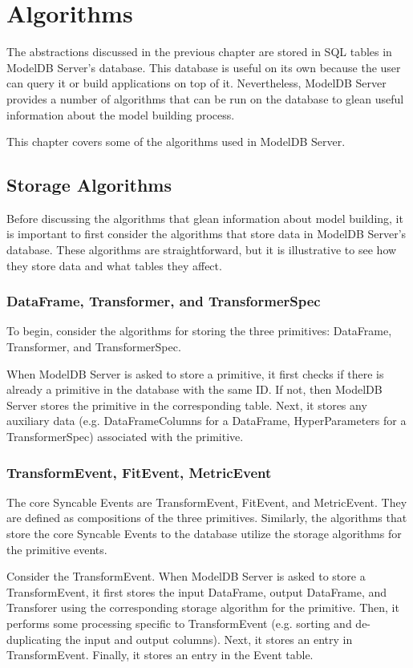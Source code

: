\chapter{Algorithms}
The abstractions discussed in the previous chapter are stored in SQL tables in
ModelDB Server's database. This database is useful on its own because the user can
query it or build applications on top of it. Nevertheless, ModelDB Server provides
a number of algorithms that can be run on the database to glean useful information
about the model building process.

This chapter covers some of the algorithms used in ModelDB Server.

\section{Storage Algorithms}
Before discussing the algorithms that glean information about model building, it
is important to first consider the algorithms that store data in ModelDB Server's 
database. These algorithms are straightforward, but it is illustrative to see
how they store data and what tables they affect.

\subsection{DataFrame, Transformer, and TransformerSpec}
To begin, consider the algorithms for storing the three primitives: DataFrame, 
Transformer, and TransformerSpec.

When ModelDB Server is asked to store a primitive, it first checks if there is already
a primitive in the database with the same ID. If not, then ModelDB Server stores the primitive
in the corresponding table. Next, it stores any auxiliary data (e.g. DataFrameColumns for a DataFrame, 
HyperParameters for a TransformerSpec) associated with the primitive.

\subsection{TransformEvent, FitEvent, MetricEvent}
The core Syncable Events are TransformEvent, FitEvent, and MetricEvent. They
are defined as compositions of the three primitives. Similarly, the algorithms
that store the core Syncable Events to the database utilize the storage algorithms
for the primitive events.

Consider the TransformEvent. When ModelDB Server is asked to store a TransformEvent, it
first stores the input DataFrame, output DataFrame, and Transforer using the corresponding
storage algorithm for the primitive. Then, it performs some processing specific to
TransformEvent (e.g. sorting and de-duplicating the input and output columns). Next,
it stores an entry in TransformEvent. Finally, it stores an entry in the Event table.

